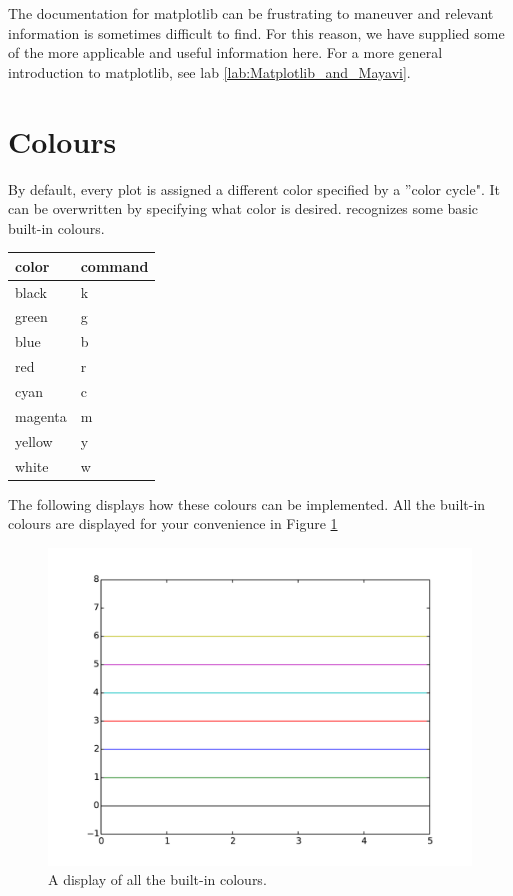 \label{mpltables}


The documentation for matplotlib can be frustrating to maneuver and relevant information is sometimes difficult to find. For this reason, we have supplied some of the more applicable and useful information here. 
For a more general introduction to matplotlib, see lab \ref{lab:Matplotlib_and_Mayavi}.


\section*{Colours}
By default, every plot is assigned a different color specified by a ''color cycle". It can be overwritten by specifying what color is desired.  recognizes some basic built-in colours. 

\begin{tabular}
{|l||l|}
\hline
color & command \\
\hline
black & k \\
green & g \\
blue & b \\
red & r \\
cyan & c \\
magenta & m \\
yellow & y \\
white & w\\
\hline

\end{tabular}


The following displays how these colours can be  implemented. All the built-in colours are displayed for your convenience in Figure \ref{colours}


\begin{figure} 
\includegraphics[width=\textwidth]{colours.pdf}
\caption{A display of all the built-in colours.}
\label{colours} 
\end{figure}


